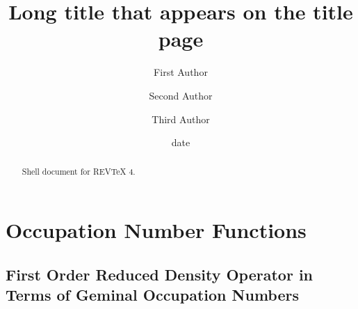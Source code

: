 \documentclass[aps,preprint]{revtex4}%
\begin{document}
\title[Short title for running header]{Long title that appears on the title page}
\author{First Author}
\author{Second Author}
\author{Third Author}

\begin{abstract}
Shell document for REV\TeX{} 4.

\end{abstract}
\date[Date text]{date}




\maketitle
\tableofcontents


\section{Occupation Number Functions}

\subsection{First Order Reduced Density Operator in Terms of Geminal
Occupation Numbers}%
\end{document}
